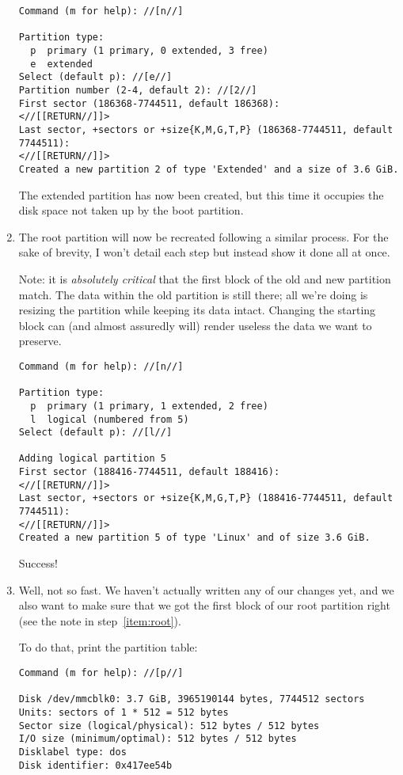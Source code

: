 \documentclass[12pt,letterpaper]{article}
\begin{document}
\begin{enumerate}
\begin{lstlisting}
Command (m for help): //[n//]

Partition type:
  p  primary (1 primary, 0 extended, 3 free)
  e  extended
Select (default p): //[e//]
Partition number (2-4, default 2): //[2//]
First sector (186368-7744511, default 186368):
<//[[RETURN//]]>
Last sector, +sectors or +size{K,M,G,T,P} (186368-7744511, default 7744511):
<//[[RETURN//]]>
Created a new partition 2 of type 'Extended' and a size of 3.6 GiB.
\end{lstlisting}

The extended partition has now been created, but this time it occupies the disk space not taken up by the boot partition.

\item \label{item:root} The root partition will now be recreated following a similar process.  For the sake of brevity, I won't detail each step but instead show it done all at once.

Note: it is \emph{absolutely critical} that the first block of the old and new partition match.  The data within the old partition is still there; all we're doing is resizing the partition while keeping its data intact.  Changing the starting block can (and almost assuredly will) render useless the data we want to preserve.
\begin{lstlisting}
Command (m for help): //[n//]

Partition type:
  p  primary (1 primary, 1 extended, 2 free)
  l  logical (numbered from 5)
Select (default p): //[l//]

Adding logical partition 5
First sector (188416-7744511, default 188416):
<//[[RETURN//]]>
Last sector, +sectors or +size{K,M,G,T,P} (188416-7744511, default 7744511):
<//[[RETURN//]]>
Created a new partition 5 of type 'Linux' and of size 3.6 GiB.
\end{lstlisting}
Success!

\item Well, not so fast.  We haven't actually written any of our changes yet, and we also want to make sure that we got the first block of our root partition right (see the note in step~\ref{item:root}).

To do that, print the partition table:
\begin{lstlisting}[basicstyle=\ttfamily\footnotesize]
Command (m for help): //[p//]

Disk /dev/mmcblk0: 3.7 GiB, 3965190144 bytes, 7744512 sectors
Units: sectors of 1 * 512 = 512 bytes
Sector size (logical/physical): 512 bytes / 512 bytes
I/O size (minimum/optimal): 512 bytes / 512 bytes
Disklabel type: dos
Disk identifier: 0x417ee54b


\end{lstlisting}
\end{enumerate}
\end{document}
